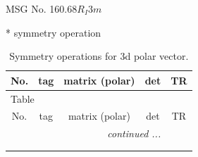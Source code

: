 \documentclass[fleqn,8pt]{jsarticle}
\begin{document}
\setcounter{MaxMatrixCols}{32}

\renewcommand{\tablename}{Table~}
\renewcommand{\figurename}{Figure~}
\begin{center}
\LARGE
MSG No. 160.68\quad$R_{I}3m$
\end{center}
* symmetry operation
\renewcommand{\arraystretch}{1.3}
\begin{longtable}{ccccc}
\caption{Symmetry operations for 3d polar vector.}
 \\
 \hline \hline
No. & tag & matrix (polar) & det & TR \\ \hline \endfirsthead

\multicolumn{4}{l}{\tablename\ \thetable{}} \\
 \hline \hline
No. & tag & matrix (polar) & det & TR \\ \hline \endhead

 \hline \hline
\multicolumn{4}{r}{\footnotesize\it continued ...} \\ \endfoot

 \hline \hline
\multicolumn{4}{r}{} \\ \endlastfoot


\end{longtable}
\end{document}
